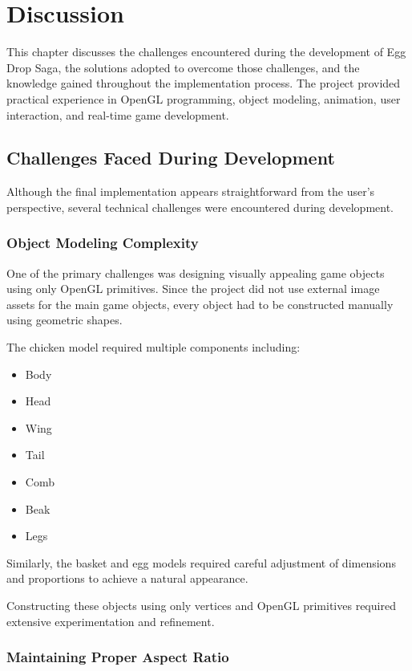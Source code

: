 \documentclass[12pt,a4paper]{report}
\begin{document}
\chapter{Discussion}

This chapter discusses the challenges encountered during the development of Egg Drop Saga, the solutions adopted to overcome those challenges, and the knowledge gained throughout the implementation process. The project provided practical experience in OpenGL programming, object modeling, animation, user interaction, and real-time game development.

\section{Challenges Faced During Development}

Although the final implementation appears straightforward from the user's perspective, several technical challenges were encountered during development.

\subsection*{Object Modeling Complexity}

One of the primary challenges was designing visually appealing game objects using only OpenGL primitives. Since the project did not use external image assets for the main game objects, every object had to be constructed manually using geometric shapes.

The chicken model required multiple components including:

\begin{itemize}
\item Body
\item Head
\item Wing
\item Tail
\item Comb
\item Beak
\item Legs
\end{itemize}

Similarly, the basket and egg models required careful adjustment of dimensions and proportions to achieve a natural appearance.

Constructing these objects using only vertices and OpenGL primitives required extensive experimentation and refinement.

\subsection*{Maintaining Proper Aspect Ratio}
\end{document}
